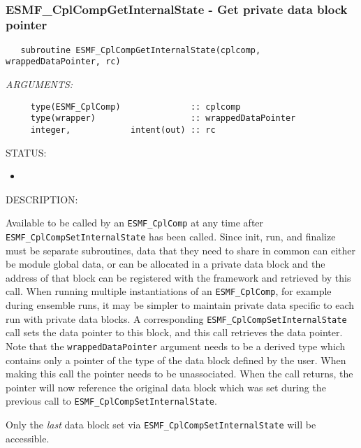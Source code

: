  
\mbox{}\hrulefill\ 
 
\subsubsection [ESMF\_CplCompGetInternalState] {ESMF\_CplCompGetInternalState - Get private data block pointer}


  
\begin{verbatim}   subroutine ESMF_CplCompGetInternalState(cplcomp, wrappedDataPointer, rc)\end{verbatim}{\em ARGUMENTS:}
\begin{verbatim}     type(ESMF_CplComp)              :: cplcomp
     type(wrapper)                   :: wrappedDataPointer
     integer,            intent(out) :: rc\end{verbatim}
{\sf STATUS:}
   \begin{itemize}
   \item{}
   \end{itemize}
  
{\sf DESCRIPTION:\\ }


   Available to be called by an {\tt ESMF\_CplComp} at any time after
   {\tt ESMF\_CplCompSetInternalState} has been called.
   Since init, run, and finalize must be separate subroutines, data that
   they need to share in common can either be module global data, or can
   be allocated in a private data block and the address of that block
   can be registered with the framework and retrieved by this call.
   When running multiple instantiations of an {\tt ESMF\_CplComp},
   for example during ensemble runs,
   it may be simpler to maintain private data specific to
   each run with private data blocks.  A corresponding
   {\tt ESMF\_CplCompSetInternalState} call sets the data pointer to
   this block, and this call retrieves the data pointer.
   Note that the {\tt wrappedDataPointer} argument needs to be a derived type
   which contains only a pointer of the type of the data block defined
   by the user.  When making this call the pointer needs to be unassociated.
   When the call returns, the pointer will now reference the original
   data block which was set during the previous call to
   {\tt ESMF\_CplCompSetInternalState}.
  
   Only the {\em last} data block set via
   {\tt ESMF\_CplCompSetInternalState} will be accessible.
  
